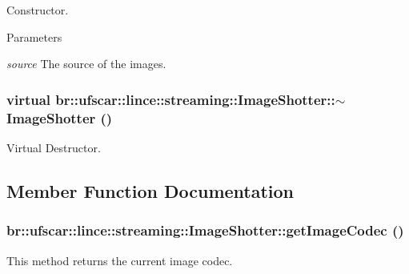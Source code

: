 Constructor. 


\begin{DoxyParams}{Parameters}
\item[{\em source}]The source of the images. \end{DoxyParams}
\hypertarget{classbr_1_1ufscar_1_1lince_1_1streaming_1_1ImageShotter_a8e7533601e7d8aeb66e604e6b45a76ed}{
\subsubsection[{$\sim$ImageShotter}]{\setlength{\rightskip}{0pt plus 5cm}virtual br::ufscar::lince::streaming::ImageShotter::$\sim$ImageShotter ()}}
\label{classbr_1_1ufscar_1_1lince_1_1streaming_1_1ImageShotter_a8e7533601e7d8aeb66e604e6b45a76ed}


Virtual Destructor. 



\subsection{Member Function Documentation}
\hypertarget{classbr_1_1ufscar_1_1lince_1_1streaming_1_1ImageShotter_a285b42308861c21f163d15b084253f48}{
\subsubsection[{getImageCodec}]{ br::ufscar::lince::streaming::ImageShotter::getImageCodec ()}}
\label{classbr_1_1ufscar_1_1lince_1_1streaming_1_1ImageShotter_a285b42308861c21f163d15b084253f48}


This method returns the current image codec. 

